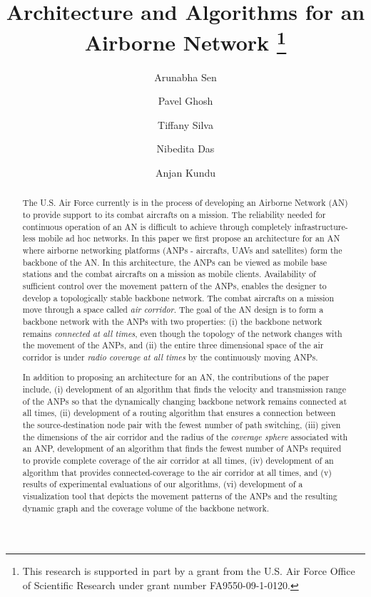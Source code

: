 \documentclass[10pt]{IEEEtran}
\title{Architecture and Algorithms for an Airborne Network
\thanks{This research is supported in part by a grant from the U.S. Air Force Office of Scientific Research under grant number FA9550-09-1-0120.}}
\author[1]{Arunabha Sen}
\author[1]{Pavel Ghosh}
\author[1]{Tiffany Silva}
\author[1]{Nibedita Das}
\author[2]{Anjan Kundu}
\affil[1]{Department of Computer Science and Engineering, Arizona State University, Tempe, AZ, 85281 \authorcr \{Pavel.Ghosh, asen, tsilva, nmaulik\}@asu.edu}
\affil[2]{Saha Institute of Nuclear Physics, Kolkata 700064, India \authorcr anjan.kundu@saha.ac.in}
\begin{document}
\maketitle
\begin{abstract}
The U.S. Air Force currently is in the process of developing an Airborne Network (AN) to provide support to its combat aircrafts on a mission. The reliability needed for continuous operation of an AN is difficult to achieve through completely infrastructure-less mobile ad hoc networks. In this paper we first propose an architecture for an AN where airborne networking platforms (ANPs - aircrafts, UAVs and satellites) form the backbone of the AN. In this architecture, the ANPs can be viewed as mobile base stations and the combat aircrafts on a mission as mobile clients. Availability of sufficient control over the movement pattern of the ANPs, enables the designer to develop a topologically stable backbone network. The combat aircrafts on a mission move through a space called {\em air corridor}. The goal of the AN design is to form a backbone network with the ANPs with two properties: (i) the backbone network remains {\em connected at all times}, even though the topology of the network changes with the movement of the ANPs, and (ii) the entire three dimensional space of the air corridor is under {\em radio coverage at all times} by the continuously moving ANPs.

In addition to proposing an architecture for an AN,  the contributions of the paper include, (i) development of an algorithm that finds the velocity and transmission range of the ANPs so that the dynamically changing backbone network remains connected at all times, (ii) development of a routing algorithm that ensures a connection between the source-destination  node pair with the fewest number of path switching, (iii) given the dimensions of the air corridor and the radius of the {\em coverage sphere} associated with an ANP, development of an algorithm that finds the fewest number of ANPs required to provide complete coverage of the air corridor at all times, (iv) development of an algorithm that provides connected-coverage to the air corridor at all times, and (v) results of experimental evaluations of our algorithms, (vi) development of a  visualization tool that depicts the movement patterns of the ANPs and the resulting dynamic graph and the coverage volume of the backbone network.
\end{abstract}
\end{document}
